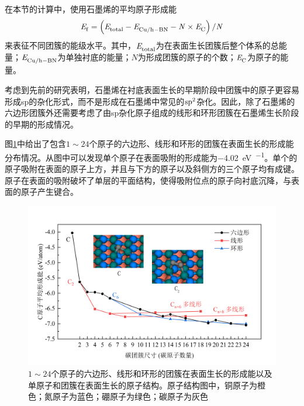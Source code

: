     在本节的计算中，使用石墨烯的平均原子形成能
    $$\it E_{\rm f}^{\rm } \it=\left(\it E_{\rm total}^{\rm } \it-\it E_{\rm Cu/h-BN}^{\rm } \it-N\times \it E_{\rm C}^{\rm } \it\right)\slash N$$
    来表征不同团簇的能级水平。其中，$\it E_{\rm total}^{\rm } \it$为在表面生长团簇后整个体系的总能量；$\it E_{\rm Cu/h-BN}^{\rm } \it$为单独衬底的能量；$N$为形成团簇的原子的个数；$\it E_{\rm C}^{\rm } \it$为原子的能量。

    考虑到先前的研究表明，石墨烯在衬底表面生长的早期阶段中团簇中的原子更容易形成sp的杂化形式，而不是形成在石墨烯中常见的$\rm sp^2$杂化。因此，除了石墨烯的六边形团簇外还需要考虑了由sp杂化原子组成的线形和环形团簇在石墨烯生长阶段的早期的形成情况。

    图\ref{fig:CG_DFT_C_cluster_onBN}中给出了包含$1 \sim 24$个原子的六边形、线形和环形的团簇在表面生长的形成能分布情况。从图中可以发现单个原子在表面吸附的形成能为\SI{-4.02}{\electronvolt\per\atom}。单个的原子吸附在表面的原子上方，并且与下方的原子以及斜侧方的三个原子均有成键。原子在表面的吸附破坏了单层的平面结构，使得吸附位点的原子向衬底沉降，与表面的原子产生键合。


    \begin{figure}[htb]
        \includegraphics{pic/CG_DFT_C_cluster_onBN.png}
        \caption{$1 \sim 24$个原子的六边形、线形和环形的团簇在表面生长的形成能以及单原子和团簇在表面生长的原子结构。原子结构图中，铜原子为橙色；氮原子为蓝色；硼原子为绿色；碳原子为灰色}
        \label{fig:CG_DFT_C_cluster_onBN}
    \end{figure}

